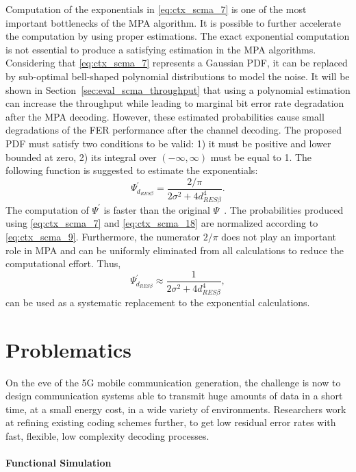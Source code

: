 Computation of the exponentials in \eqref{eq:ctx_scma_7} is one of the most
important bottlenecks of the MPA algorithm. It is possible to further accelerate
the computation by using proper estimations. The exact exponential computation
is not essential to produce a satisfying estimation in the MPA algorithms.
Considering that \eqref{eq:ctx_scma_7} represents a Gaussian PDF, it can be
replaced by sub-optimal bell-shaped polynomial distributions to model the noise.
It will be shown in Section~\ref{sec:eval_scma_throughput} that using a
polynomial estimation can increase the throughput while leading to marginal bit
error rate degradation after the MPA decoding. However, these estimated
probabilities cause small degradations of the FER performance after the channel
decoding. The proposed PDF must satisfy two conditions to be valid: 1) it must
be positive and lower bounded at zero, 2) its integral over $(-\infty, \infty)$
must be equal to 1. The following function is suggested to estimate the
exponentials:
\begin{equation}
  \label{eq:ctx_scma_18}
  \Psi^{'}_{d_{RES \beta}} = \frac{2 / \pi}{2\sigma^2 + 4d^4_{RES \beta}}.
\end{equation}
The computation of $\Psi^{'}$ is faster than the original
$\Psi$~\cite{Ghaffari2017,Ghaffari2019}. The probabilities produced using
\eqref{eq:ctx_scma_7} and \eqref{eq:ctx_scma_18} are normalized according to
\eqref{eq:ctx_scma_9}. Furthermore, the numerator $2/\pi$ does not play an
important role in MPA and can be uniformly eliminated from all calculations to
reduce the computational effort. Thus,
\begin{equation}
  \label{eq:ctx_scma_19}
  \Psi^{'}_{d_{RES \beta}} \approx \frac{1}{2\sigma^2 + 4d^4_{RES \beta}},
\end{equation}
can be used as a systematic replacement to the exponential calculations.

\section{Problematics}

On the eve of the 5G mobile communication generation, the challenge is now to
design communication systems able to transmit huge amounts of data in a short
time, at a small energy cost, in a wide variety of environments. Researchers
work at refining existing coding schemes further, to get low residual error
rates with fast, flexible, low complexity decoding processes.

\paragraph{Functional Simulation}

